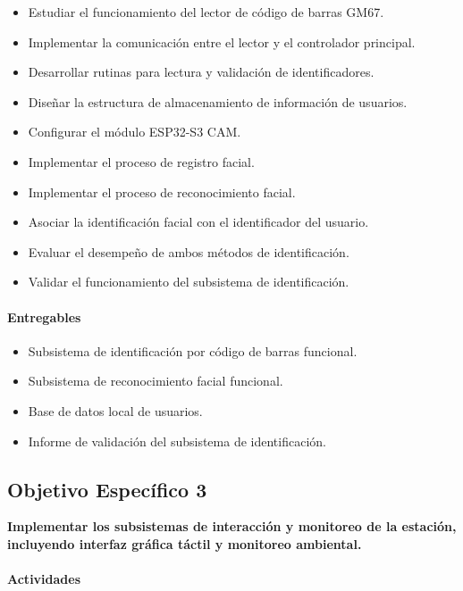 \begin{itemize}
    \item Estudiar el funcionamiento del lector de código de barras GM67.
    \item Implementar la comunicación entre el lector y el controlador principal.
    \item Desarrollar rutinas para lectura y validación de identificadores.
    \item Diseñar la estructura de almacenamiento de información de usuarios.
    \item Configurar el módulo ESP32-S3 CAM.
    \item Implementar el proceso de registro facial.
    \item Implementar el proceso de reconocimiento facial.
    \item Asociar la identificación facial con el identificador del usuario.
    \item Evaluar el desempeño de ambos métodos de identificación.
    \item Validar el funcionamiento del subsistema de identificación.
\end{itemize}

\paragraph{Entregables}

\begin{itemize}
    \item Subsistema de identificación por código de barras funcional.
    \item Subsistema de reconocimiento facial funcional.
    \item Base de datos local de usuarios.
    \item Informe de validación del subsistema de identificación.
\end{itemize}


\subsection{Objetivo Específico 3}

\textbf{Implementar los subsistemas de interacción y monitoreo de la estación, incluyendo interfaz gráfica táctil y monitoreo ambiental.}

\paragraph{Actividades}

